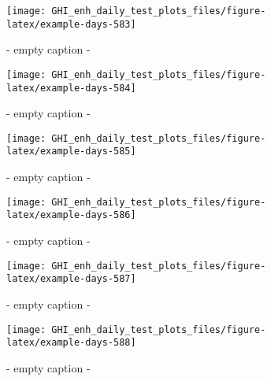\documentclass[
  10pt,
  a4paper,oneside]{article}
\begin{document}
\begin{figure}[H]

{\centering \texttt{[image: GHI\_enh\_daily\_test\_plots\_files/figure-latex/example-days-583]} 

}

\caption{ - empty caption - }\label{fig:example-days-583}
\end{figure}

\begin{figure}[H]

{\centering \texttt{[image: GHI\_enh\_daily\_test\_plots\_files/figure-latex/example-days-584]} 

}

\caption{ - empty caption - }\label{fig:example-days-584}
\end{figure}

\begin{figure}[H]

{\centering \texttt{[image: GHI\_enh\_daily\_test\_plots\_files/figure-latex/example-days-585]} 

}

\caption{ - empty caption - }\label{fig:example-days-585}
\end{figure}

\begin{figure}[H]

{\centering \texttt{[image: GHI\_enh\_daily\_test\_plots\_files/figure-latex/example-days-586]} 

}

\caption{ - empty caption - }\label{fig:example-days-586}
\end{figure}

\begin{figure}[H]

{\centering \texttt{[image: GHI\_enh\_daily\_test\_plots\_files/figure-latex/example-days-587]} 

}

\caption{ - empty caption - }\label{fig:example-days-587}
\end{figure}

\begin{figure}[H]

{\centering \texttt{[image: GHI\_enh\_daily\_test\_plots\_files/figure-latex/example-days-588]} 

}

\caption{ - empty caption - }\label{fig:example-days-588}
\end{figure}
\end{document}
